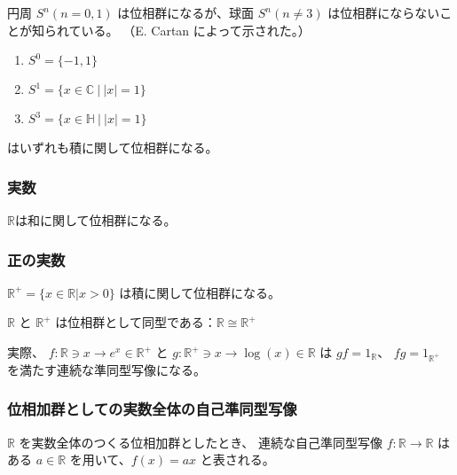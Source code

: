 \documentclass[uplatex,a4j,12pt,dvipdfmx]{jsarticle}
\begin{document}
円周 $S^{n} (n=0,1)$ は位相群になるが、球面 $S^{n} (n \neq 3)$ は位相群にならないことが知られている。
（E. Cartan によって示された。）

\begin{enumerate}
	\item $S^{0} = \{ -1, 1 \}$
	\item $S^{1} = \{ x \in \mathbb{C} \ | \ |x| = 1 \}$
	\item $S^{3} = \{ x \in \mathbb{H} \ | \ |x| = 1 \}$
\end{enumerate}

はいずれも積に関して位相群になる。


\subsubsection{実数}

$\mathbb{R}$は和に関して位相群になる。

\subsubsection{正の実数}

$\mathbb{R}^{+} = \{ x \in \mathbb{R} | x > 0 \}$
は積に関して位相群になる。

$\mathbb{R}$ と $\mathbb{R}^{+}$ は位相群として同型である：$\mathbb{R} \cong \mathbb{R}^{+}$

実際、
$f: \mathbb{R} \ni x \to e^{x} \in \mathbb{R}^{+}$
と
$g: \mathbb{R}^{+} \ni x \to \log(x) \in \mathbb{R}$
は
$gf=1_{\mathbb{R}}$、
$fg=1_{\mathbb{R}^{+}}$
を満たす連続な準同型写像になる。


\subsubsection{位相加群としての実数全体の自己準同型写像}

$\mathbb{R}$ を実数全体のつくる位相加群としたとき、
連続な自己準同型写像
$f: \mathbb{R} \to \mathbb{R}$
はある $a \in \mathbb{R}$ を用いて、$f(x) = ax$ と表される。
\end{document}
